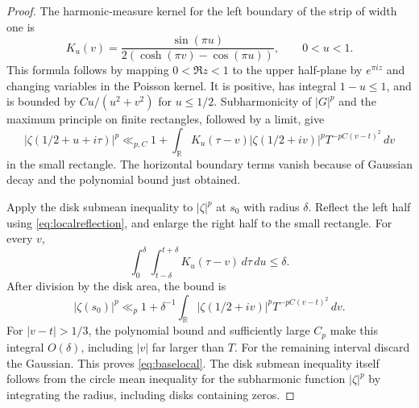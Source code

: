 \begin{proof}
The harmonic-measure kernel for the left boundary of the strip of width
one is
\[
 K_u(v)=\frac{\sin(\pi u)}{2(\cosh(\pi v)-\cos(\pi u))},
 \qquad 0<u<1.
\]
This formula follows by mapping $0<\Re z<1$ to the upper half-plane
by $e^{\pi i z}$ and changing variables in the Poisson kernel.
It is positive, has integral $1-u\le1$, and is bounded by
$C u/(u^2+v^2)$ for $u\le1/2$. Subharmonicity of $|G|^p$ and the
maximum principle on finite rectangles, followed by a limit, give
\[
 |\zeta(1/2+u+i\tau)|^p
 \ll_{p,C}1+\int_{\mathbb R}K_u(\tau-v)
 |\zeta(1/2+iv)|^p T^{-pC(v-t)^2}\,dv
\]
in the small rectangle. The horizontal boundary terms vanish because
of Gaussian decay and the polynomial bound just obtained.

Apply the disk submean inequality to $|\zeta|^p$ at $s_0$ with radius
$\delta$. Reflect the left half using \eqref{eq:localreflection},
and enlarge the right half to the small rectangle. For every $v$,
\[
 \int_0^\delta\int_{t-\delta}^{t+\delta}K_u(\tau-v)\,d\tau\,du
 \le\delta.
\]
After division by the disk area, the bound is
\[
 |\zeta(s_0)|^p\ll_p
 1+\delta^{-1}\int_{\mathbb R}
 |\zeta(1/2+iv)|^pT^{-pC(v-t)^2}\,dv.
\]
For $|v-t|>1/3$, the polynomial bound and sufficiently large $C_p$
make this integral $O(\delta)$, including $|v|$ far larger than $T$.
For the remaining interval discard the Gaussian. This proves
\eqref{eq:baselocal}. The disk submean inequality itself follows from
the circle mean inequality for the subharmonic function $|\zeta|^p$
by integrating the radius, including disks containing zeros.
\end{proof}

